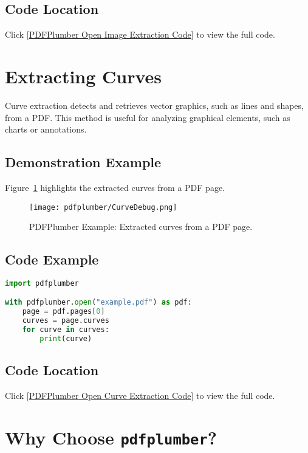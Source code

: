 \subsection{Code Location}
Click [\href{run:../Code/General/pdfplumber/image.py}{PDFPlumber Open Image Extraction Code}] to view the full code.

\section{Extracting Curves}
\label{sec:extracting curves}

Curve extraction detects and retrieves vector graphics, such as lines and shapes, from a PDF. This method is useful for analyzing graphical elements, such as charts or annotations.\cite{Singer:2022}

\subsection{Demonstration Example}
Figure~\ref{fig:PDFPlumber curve debug} highlights the extracted curves from a PDF page.

\begin{figure}[h!]
\centering
\texttt{[image: pdfplumber/CurveDebug.png]}
\caption{PDFPlumber Example: Extracted curves from a PDF page.}
\label{fig:PDFPlumber curve debug}
\end{figure}

\subsection{Code Example}
\begin{lstlisting}[language=Python, caption={PDFPlumber Extracting curves from a PDF.}]
import pdfplumber

with pdfplumber.open("example.pdf") as pdf:
    page = pdf.pages[0]
    curves = page.curves
    for curve in curves:
        print(curve)
\end{lstlisting}

\subsection{Code Location}
Click [\href{run:../Code/General/pdfplumber/curve.py}{PDFPlumber Open Curve Extraction Code}] to view the full code.

\section{Why Choose \texttt{pdfplumber}?}
\label{sec:whychoose}

